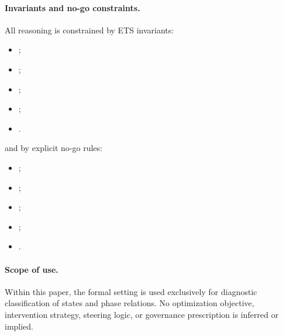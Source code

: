 \paragraph{Invariants and no-go constraints.}
All reasoning is constrained by ETS invariants:
\begin{itemize}
  \item {};
  \item {};
  \item {};
  \item {};
  \item {}.
\end{itemize}
and by explicit no-go rules:
\begin{itemize}
  \item {};
  \item {};
  \item {};
  \item {};
  \item {}.
\end{itemize}

\paragraph{Scope of use.}
Within this paper, the formal setting is used exclusively for diagnostic
classification of states and phase relations. No optimization objective,
intervention strategy, steering logic, or governance prescription is inferred or
implied.
